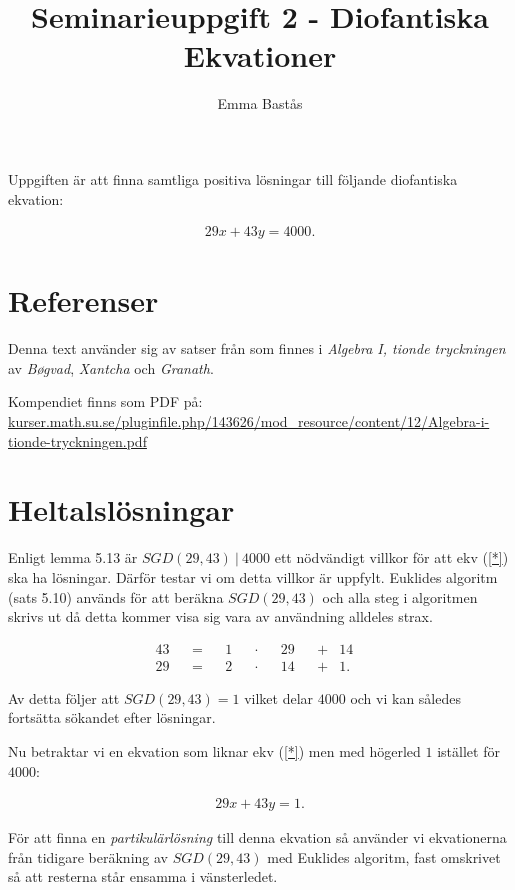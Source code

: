 \documentclass{article}
\title{Seminarieuppgift 2 - Diofantiska Ekvationer}
\author{Emma Bastås}
\begin{document}
\maketitle

Uppgiften är att finna samtliga positiva lösningar till följande diofantiska ekvation:

\begin{gather*}
  29x + 43y = 4000. \label{*}\tag{$\star$}
\end{gather*}

\section*{Referenser}

Denna text använder sig av satser från som finnes i \emph{Algebra I, tionde tryckningen} av \emph{Bøgvad}, \emph{Xantcha} och \emph{Granath}.

Kompendiet finns som PDF på: \url{kurser.math.su.se/pluginfile.php/143626/mod_resource/content/12/Algebra-i-tionde-tryckningen.pdf}

\section*{Heltalslösningar}

Enligt lemma 5.13 är $SGD(29, 43)\: |\: 4000$ ett nödvändigt villkor för att ekv (\ref{*}) ska ha lösningar. Därför testar vi om detta villkor är uppfylt. Euklides algoritm (sats 5.10) används för att beräkna $SGD(29, 43)$ och alla steg i algoritmen skrivs ut då detta kommer visa sig vara av användning alldeles strax.

\begin{align}
  &43& &=& &1& &\cdot& &29& &+& 14&& \label{sgd-1} \\
  &29& &=& &2& &\cdot& &14& &+& 1\text{.} && \label{sgd-2}
\end{align}

Av detta följer att $SGD(29, 43) = 1$ vilket delar $4000$ och vi kan således fortsätta sökandet efter lösningar.

Nu betraktar vi en ekvation som liknar ekv (\ref{*}) men med högerled $1$ istället för $4000$:

\begin{gather*}
  29x + 43y = 1\text{.} \label{H}\tag{H}
\end{gather*}

För att finna en \emph{partikulärlösning} till denna ekvation så använder vi ekvationerna från tidigare beräkning av $SGD(29, 43)$ med Euklides algoritm, fast omskrivet så att resterna står ensamma i vänsterledet.
\end{document}

